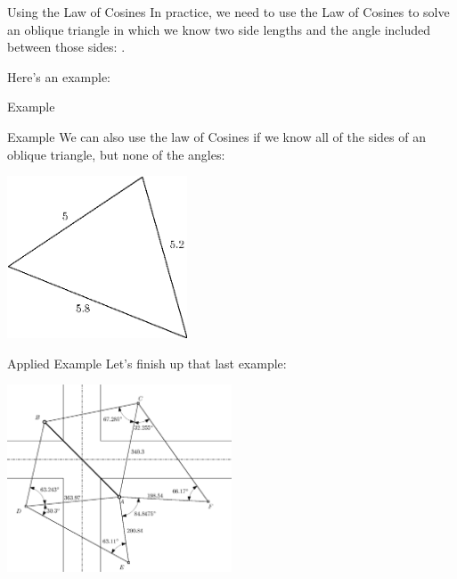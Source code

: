 \documentclass[presentation]{beamer}
\begin{document}
\begin{frame}[label={sec:org0f14db2}]{Using the Law of Cosines}
In practice, we need to use the Law of Cosines to solve an oblique
triangle in which we know two side lengths and the angle included
between those sides: \uline{\hspace*{1in}}.

Here's an example:

\begin{center}
\end{center}
\end{frame}


\begin{frame}[label={sec:orgdace2d7}]{Example}
\end{frame}

\begin{frame}[label={sec:orge255af3}]{Example}
We can also use the law of Cosines if we know all of the sides of an
oblique triangle, but none of the angles:

\includegraphics[width=0.4\textwidth]{./sss}
\vspace{10in}
\end{frame}

\begin{frame}[label={sec:org7b62172}]{Applied Example}
Let's finish up that last example:

\includegraphics[width=0.5\textwidth]{./trigStar}
\vspace{10in}
\end{frame}
\end{document}
